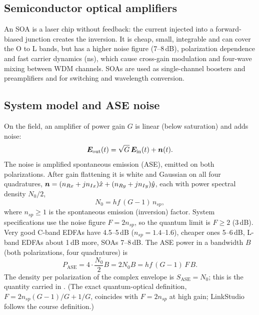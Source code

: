 \subsection{Semiconductor optical amplifiers}
An SOA is a laser chip without feedback: the current injected into a forward-biased junction
creates the inversion. It is cheap, small, integrable and can cover the O to L bands, but has a
higher noise figure (7--8\,dB), polarization dependence and fast carrier dynamics (ns), which cause
cross-gain modulation and four-wave mixing between WDM channels. SOAs are used as single-channel
boosters and preamplifiers and for switching and wavelength conversion.

\subsection{System model and ASE noise}
On the field, an amplifier of power gain $G$ is linear (below saturation) and adds noise:
\begin{equation}
  \bm{E}_{\mathrm{out}}(t)=\sqrt G\,\bm{E}_{\mathrm{in}}(t)+\bm{n}(t).
\end{equation}
The noise is amplified spontaneous emission (ASE), emitted on both polarizations. After gain
flattening it is white and Gaussian on all four quadratures,
$\bm{n}=(n_{Rx}+jn_{Ix})\hat x+(n_{Ry}+jn_{Iy})\hat y$, each with power spectral density $N_0/2$,
\begin{equation}
  N_0=hf\,(G-1)\,n_{sp},
\end{equation}
where $n_{sp}\ge1$ is the spontaneous emission (inversion) factor. System specifications use the noise
figure $F=2n_{sp}$, so the quantum limit is $F\ge2$ (3\,dB). Very good C-band EDFAs have 4.5--5\,dB
($n_{sp}=1.4$--1.6), cheaper ones 5--6\,dB, L-band EDFAs about 1\,dB more, SOAs 7--8\,dB. The ASE power in a
bandwidth $B$ (both polarizations, four quadratures) is
\begin{equation}
  P_{\mathrm{ASE}}=4\cdot\frac{N_0}{2}B=2N_0B=hf\,(G-1)\,F\,B .
\end{equation}
The density per polarization of the complex envelope is $S_{\mathrm{ASE}}=N_0$; this is the quantity carried
in . (The exact quantum-optical definition, $F=2n_{sp}(G-1)/G+1/G$, coincides with
$F=2n_{sp}$ at high gain; LinkStudio follows the course definition.)

